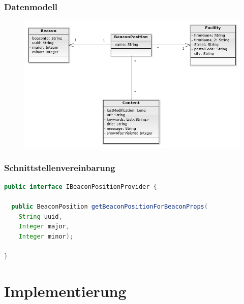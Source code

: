 \documentclass{beamer}
\begin{document}
\begin{frame}
\frametitle<presentation>{Datenmodell}

\begin{figure}[!h]
\centering
\includegraphics[scale=0.5]{./Abbildungen/Classdiagram1.png}
\label{fig:classdiagram}
\end{figure}
\end{frame}

\begin{frame}[fragile]
\frametitle<presentation>{Schnittstellenvereinbarung}


\begin{lstlisting}[language=Java, basicstyle=\ttfamily\scriptsize]
public interface IBeaconPositionProvider {

  public BeaconPosition getBeaconPositionForBeaconProps(
    String uuid,
    Integer major,
    Integer minor);
	
}

\end{lstlisting}


\end{frame}



\section{Implementierung}
\end{document}
